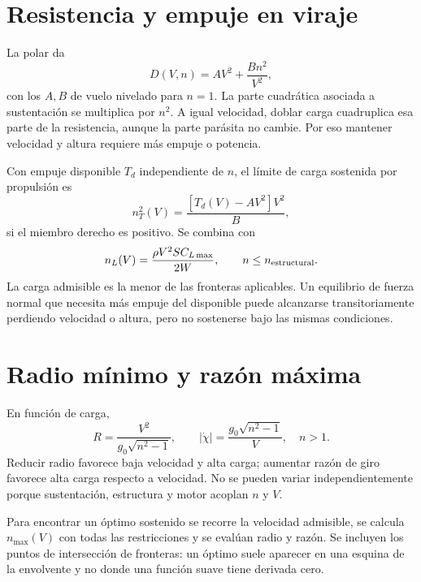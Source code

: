 \section{Resistencia y empuje en viraje}
La polar da
\begin{equation}
D(V,n)=AV^2+\frac{Bn^2}{V^2},
\label{eq:dragturn}
\end{equation}
con los $A,B$ de vuelo nivelado para $n=1$. La parte cuadrática asociada a sustentación se multiplica por $n^2$. A igual velocidad, doblar carga cuadruplica esa parte de la resistencia, aunque la parte parásita no cambie. Por eso mantener velocidad y altura requiere más empuje o potencia.

Con empuje disponible $T_d$ independiente de $n$, el límite de carga sostenida por propulsión es
\begin{equation}
n_T^2(V)=\frac{[T_d(V)-AV^2]V^2}{B},
\end{equation}
si el miembro derecho es positivo. Se combina con
\begin{equation}
n_L(V)=\frac{\rho V^2SC_{L\max}}{2W},\qquad n\leq n_{\rm estructural}.
\end{equation}
La carga admisible es la menor de las fronteras aplicables. Un equilibrio de fuerza normal que necesita más empuje del disponible puede alcanzarse transitoriamente perdiendo velocidad o altura, pero no sostenerse bajo las mismas condiciones.

\section{Radio mínimo y razón máxima}
En función de carga,
\begin{equation}
R=\frac{V^2}{g_0\sqrt{n^2-1}},\qquad
|\dot\chi|=\frac{g_0\sqrt{n^2-1}}{V},\quad n>1.
\end{equation}
Reducir radio favorece baja velocidad y alta carga; aumentar razón de giro favorece alta carga respecto a velocidad. No se pueden variar independientemente porque sustentación, estructura y motor acoplan $n$ y $V$.

Para encontrar un óptimo sostenido se recorre la velocidad admisible, se calcula $n_{\max}(V)$ con todas las restricciones y se evalúan radio y razón. Se incluyen los puntos de intersección de fronteras: un óptimo suele aparecer en una esquina de la envolvente y no donde una función suave tiene derivada cero.


